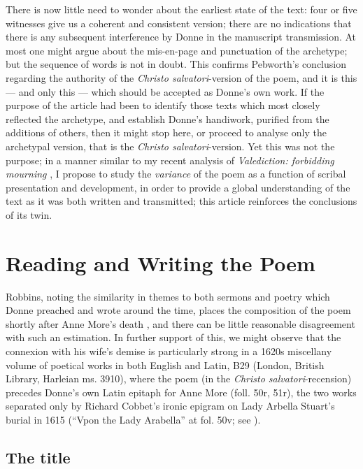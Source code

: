 \begin{paper}
There is now little need to wonder about the earliest state of the text:
four or five witnesses give us a coherent and consistent version; there
are no indications that there is any subsequent interference by Donne in
the manuscript transmission. At most one might argue about the
mis-en-page and punctuation of the archetype; but the sequence of words
is not in doubt. This confirms Pebworth's conclusion regarding the
authority of the \emph{Christo salvatori}-version of the poem, and it is
this --- and only this --- which should be accepted as Donne's own work.
If the purpose of the article had been to identify those texts which
most closely reflected the archetype, and establish Donne's handiwork,
purified from the additions of others, then it might stop here, or
proceed to analyse only the archetypal version, that is the \emph{Christo
salvatori}-version. Yet this was not the purpose; in a manner similar
to my recent analysis of \emph{Valediction: forbidding mourning} \citep{lappin_baroquely_2019}, I propose to study the \emph{variance} of the poem as a function
of scribal presentation and development, in order to provide a global
understanding of the text as it was both written and transmitted; this
article reinforces the conclusions of its twin.

\section{Reading and Writing the Poem}

Robbins, noting the similarity in themes to both sermons and poetry
which Donne preached and wrote around the time, places the composition
of the poem shortly after Anne More's death \citep[654]{robbins_complete_2013}, and
there can be little reasonable disagreement with such an estimation. In
further support of this, we might observe that the connexion with his
wife's demise is particularly strong in a 1620s miscellany volume of
poetical works in both English and Latin, B29 (London, British Library,
Harleian ms. 3910), where the poem (in the \emph{Christo
salvatori}-recension) precedes Donne's own Latin epitaph for Anne More
(foll. 50r, 51r), the two works separated only by Richard Cobbet's
ironic epigram on Lady Arbella Stuart's burial in 1615 (``Vpon the Lady
Arabella'' at fol. 50v; see ).

\subsection{The title}


\end{paper}
